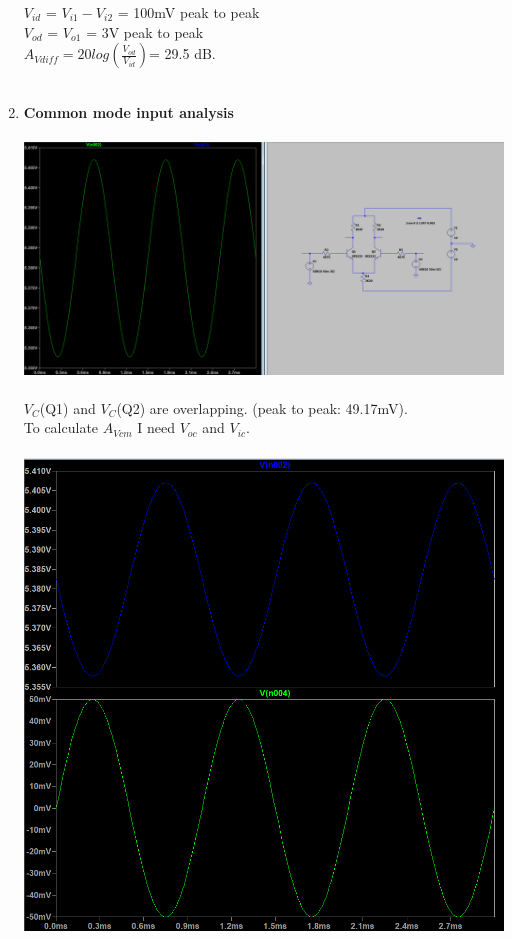 \documentclass{article}
\begin{document}
\begin{enumerate}
		\(V_{id}\) = \(V_{i1} - V_{i2}\) = 100mV peak to peak\\
		\(V_{od}\) = \(V_{o1}\) = 3V peak to peak\\
		\(A_{Vdiff} = 20log(\frac{V_{od}}{V_{id}}) \)= 29.5 dB.\\\\
		\pagebreak
		\item  \textbf{Common mode input analysis}\\\\
		\includegraphics[scale=0.4]{prelab 4/circuit 3 - coll voltages}\\\\
		\(V_C\)(Q1) and \(V_C\)(Q2) are overlapping. (peak to peak: 49.17mV).\\
		To calculate \(A_{Vcm}\) I need \(V_{oc}\) and \(V_{ic}\).\\\\
		\includegraphics[scale=0.6]{prelab 4/circuit 2 - avcm}\\\\

\end{enumerate}
\end{document}
